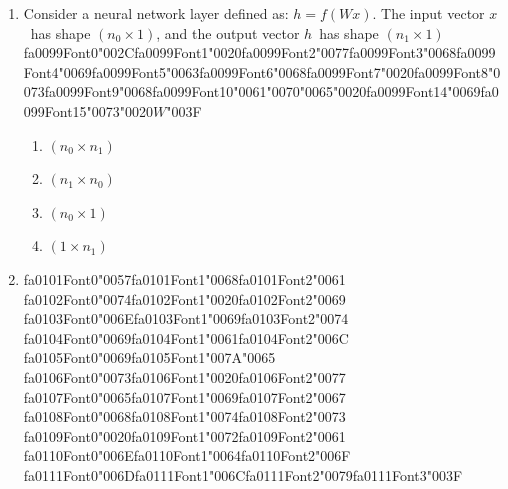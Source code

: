 \documentclass[12pt]{article}
\begin{document}
\begin{enumerate}[label=Q\arabic*.]
\begin{enumerate}[label=(\Alph*)]
    \item Both the input at time $t$ and the hidden state at time $t-1$
    \item All future inputs
\end{enumerate}
\item Consider a neural network layer defined as: $h = f(Wx)$. The input vector $x$\  has shape $(n_0 \times 1)$, and the output vector $h$\  has shape $(n_1 \times 1)${\csname fa0099Font0\endcsname\char"002C}{\csname fa0099Font1\endcsname\char"0020}{\csname fa0099Font2\endcsname\char"0077}{\csname fa0099Font3\endcsname\char"0068}{\csname fa0099Font4\endcsname\char"0069}{\csname fa0099Font5\endcsname\char"0063}{\csname fa0099Font6\endcsname\char"0068}{\csname fa0099Font7\endcsname\char"0020}{\csname fa0099Font8\endcsname\char"0073}{\csname fa0099Font9\endcsname\char"0068}{\csname fa0099Font10\endcsname\char"0061}{\char"0070}{\char"0065}{\char"0020}{\csname fa0099Font14\endcsname\char"0069}{\csname fa0099Font15\endcsname\char"0073}{\char"0020}$W${\char"003F}
\begin{enumerate}[label=(\Alph*)]
    \item $(n_0 \times n_1)$
    \item $(n_1 \times n_0)$
    \item $(n_0 \times 1)$
    \item $(1 \times n_1)$
\end{enumerate}
\item {\csname fa0101Font0\endcsname\char"0057}{\csname fa0101Font1\endcsname\char"0068}{\csname fa0101Font2\endcsname\char"0061} {\csname fa0102Font0\endcsname\char"0074}{\csname fa0102Font1\endcsname\char"0020}{\csname fa0102Font2\endcsname\char"0069} {\csname fa0103Font0\endcsname\char"006E}{\csname fa0103Font1\endcsname\char"0069}{\csname fa0103Font2\endcsname\char"0074} {\csname fa0104Font0\endcsname\char"0069}{\csname fa0104Font1\endcsname\char"0061}{\csname fa0104Font2\endcsname\char"006C} {\csname fa0105Font0\endcsname\char"0069}{\csname fa0105Font1\endcsname\char"007A}{\char"0065} {\csname fa0106Font0\endcsname\char"0073}{\csname fa0106Font1\endcsname\char"0020}{\csname fa0106Font2\endcsname\char"0077} {\csname fa0107Font0\endcsname\char"0065}{\csname fa0107Font1\endcsname\char"0069}{\csname fa0107Font2\endcsname\char"0067} {\csname fa0108Font0\endcsname\char"0068}{\csname fa0108Font1\endcsname\char"0074}{\csname fa0108Font2\endcsname\char"0073} {\csname fa0109Font0\endcsname\char"0020}{\csname fa0109Font1\endcsname\char"0072}{\csname fa0109Font2\endcsname\char"0061} {\csname fa0110Font0\endcsname\char"006E}{\csname fa0110Font1\endcsname\char"0064}{\csname fa0110Font2\endcsname\char"006F} {\csname fa0111Font0\endcsname\char"006D}{\csname fa0111Font1\endcsname\char"006C}{\csname fa0111Font2\endcsname\char"0079}{\csname fa0111Font3\endcsname\char"003F}

\end{enumerate}
\end{document}
